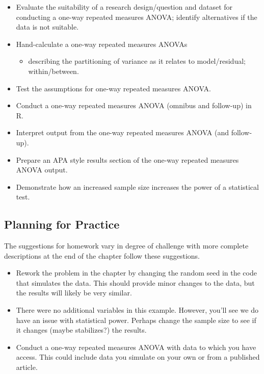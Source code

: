 \documentclass[
  11pt,
]{book}
\providecommand{\tightlist}{%
  \setlength{\itemsep}{0pt}\setlength{\parskip}{0pt}}
\begin{document}
\begin{itemize}
\tightlist
\item
  Evaluate the suitability of a research design/question and dataset for conducting a one-way repeated measures ANOVA; identify alternatives if the data is not suitable.
\item
  Hand-calculate a one-way repeated measures ANOVAs

  \begin{itemize}
  \tightlist
  \item
    describing the partitioning of variance as it relates to model/residual; within/between.
  \end{itemize}
\item
  Test the assumptions for one-way repeated measures ANOVA.
\item
  Conduct a one-way repeated measures ANOVA (omnibus and follow-up) in R.
\item
  Interpret output from the one-way repeated measures ANOVA (and follow-up).
\item
  Prepare an APA style results section of the one-way repeated measures ANOVA output.
\item
  Demonstrate how an increased sample size increases the power of a statistical test.
\end{itemize}

\hypertarget{planning-for-practice-6}{%
\subsection{Planning for Practice}\label{planning-for-practice-6}}

The suggestions for homework vary in degree of challenge with more complete descriptions at the end of the chapter follow these suggestions.

\begin{itemize}
\tightlist
\item
  Rework the problem in the chapter by changing the random seed in the code that simulates the data. This should provide minor changes to the data, but the results will likely be very similar.
\item
  There were no additional variables in this example. However, you'll see we do have an issue with statistical power. Perhaps change the sample size to see if it changes (maybe stabilizes?) the results.
\item
  Conduct a one-way repeated measures ANOVA with data to which you have access. This could include data you simulate on your own or from a published article.
\end{itemize}
\end{document}

